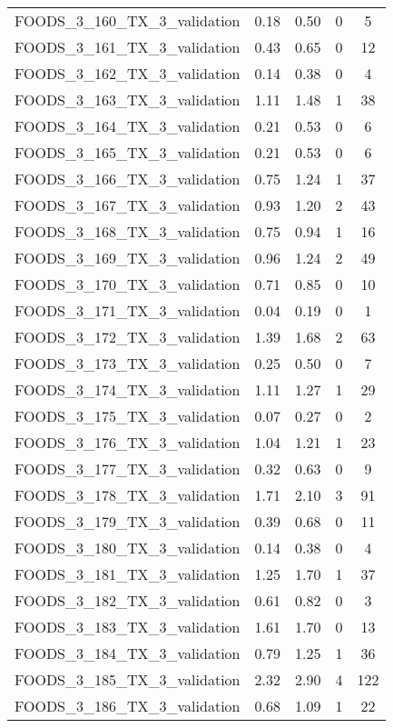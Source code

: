 \begin{table}
\begin{tabular}{|l|c|c|c|c|}
FOODS\_3\_160\_TX\_3\_validation & 0.18 & 0.50 & 0 & 5 \\
FOODS\_3\_161\_TX\_3\_validation & 0.43 & 0.65 & 0 & 12 \\
FOODS\_3\_162\_TX\_3\_validation & 0.14 & 0.38 & 0 & 4 \\
FOODS\_3\_163\_TX\_3\_validation & 1.11 & 1.48 & 1 & 38 \\
FOODS\_3\_164\_TX\_3\_validation & 0.21 & 0.53 & 0 & 6 \\
FOODS\_3\_165\_TX\_3\_validation & 0.21 & 0.53 & 0 & 6 \\
FOODS\_3\_166\_TX\_3\_validation & 0.75 & 1.24 & 1 & 37 \\
FOODS\_3\_167\_TX\_3\_validation & 0.93 & 1.20 & 2 & 43 \\
FOODS\_3\_168\_TX\_3\_validation & 0.75 & 0.94 & 1 & 16 \\
FOODS\_3\_169\_TX\_3\_validation & 0.96 & 1.24 & 2 & 49 \\
FOODS\_3\_170\_TX\_3\_validation & 0.71 & 0.85 & 0 & 10 \\
FOODS\_3\_171\_TX\_3\_validation & 0.04 & 0.19 & 0 & 1 \\
FOODS\_3\_172\_TX\_3\_validation & 1.39 & 1.68 & 2 & 63 \\
FOODS\_3\_173\_TX\_3\_validation & 0.25 & 0.50 & 0 & 7 \\
FOODS\_3\_174\_TX\_3\_validation & 1.11 & 1.27 & 1 & 29 \\
FOODS\_3\_175\_TX\_3\_validation & 0.07 & 0.27 & 0 & 2 \\
FOODS\_3\_176\_TX\_3\_validation & 1.04 & 1.21 & 1 & 23 \\
FOODS\_3\_177\_TX\_3\_validation & 0.32 & 0.63 & 0 & 9 \\
FOODS\_3\_178\_TX\_3\_validation & 1.71 & 2.10 & 3 & 91 \\
FOODS\_3\_179\_TX\_3\_validation & 0.39 & 0.68 & 0 & 11 \\
FOODS\_3\_180\_TX\_3\_validation & 0.14 & 0.38 & 0 & 4 \\
FOODS\_3\_181\_TX\_3\_validation & 1.25 & 1.70 & 1 & 37 \\
FOODS\_3\_182\_TX\_3\_validation & 0.61 & 0.82 & 0 & 3 \\
FOODS\_3\_183\_TX\_3\_validation & 1.61 & 1.70 & 0 & 13 \\
FOODS\_3\_184\_TX\_3\_validation & 0.79 & 1.25 & 1 & 36 \\
FOODS\_3\_185\_TX\_3\_validation & 2.32 & 2.90 & 4 & 122 \\
FOODS\_3\_186\_TX\_3\_validation & 0.68 & 1.09 & 1 & 22 \\

\end{tabular}
\end{table}
